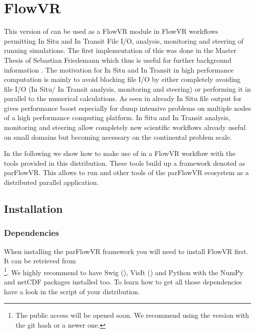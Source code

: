 \chapter{FlowVR}
\label{FlowVR}

This version of \parflow{} can be used as a FlowVR module in FlowVR workflows
\cite{dreherflexible2014}
permitting
In Situ and In Transit File I/O, analysis, monitoring and steering of running simulations.
The first implementation of this was done in the Master Thesis of Sebastian Friedemann
which thus is useful for further background information \cite{thesisFriedemann2018}.
The motivation for In Situ and In Transit in high performance computation is mainly to avoid
blocking file I/O by either completely avoiding file I/O (In Situ/ In Transit analysis,
monitoring and steering) or performing it in parallel to the numerical calculations.
As seen in \cite{thesisFriedemann2018} already In Situ file output for \parflow{} gives performance
boost especially
for dump intensive problems on multiple nodes of a high performance computing platform.
In Situ and In Transit analysis, monitoring and steering allow completely new scientific
workflows already useful on small domains but becoming necessary on the continental problem
scale.

In the following we show how to make use of \parflow{} in a FlowVR workflow with the tools
provided in this \parflow{} distribution. These tools build up a framework denoted as
parFlowVR. This allows to run \parflow{} and other tools of the parFlowVR ecosystem
as a distributed parallel application.

\section{Installation}
\subsection{Dependencies}
When installing the parFlowVR framework you will need to install
FlowVR first.
It can be retrieved from \\%
\footnote{The public access will be opened soon. We recommend using the version
with the git hash  or a newer one.}.
We highly recommend to have Swig (),
VisIt () and
Python with the NumPy and netCDF packages installed too. To learn how to get all those
dependencies have a look in the  script of your \parflow{} distribution.

